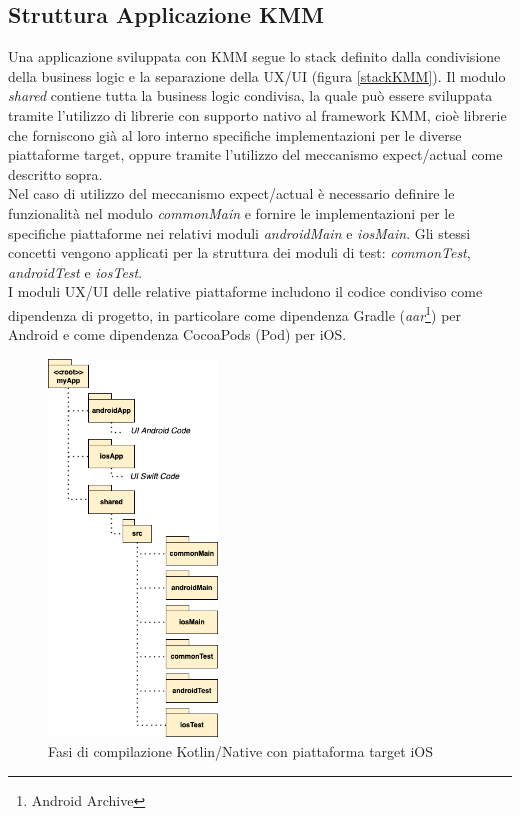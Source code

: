 \subsection{Struttura Applicazione KMM}
Una applicazione sviluppata con KMM segue lo stack definito dalla condivisione della business logic e la separazione della UX/UI (figura \ref{stackKMM}). Il modulo \textit{shared} contiene tutta la business logic condivisa, la quale può essere sviluppata tramite l'utilizzo di librerie con supporto nativo al framework KMM, cioè librerie che forniscono già al loro interno specifiche implementazioni per le diverse piattaforme target, oppure tramite l'utilizzo del meccanismo expect/actual come descritto sopra.\\
Nel caso di utilizzo del meccanismo expect/actual è necessario definire le funzionalità nel modulo \textit{commonMain} e fornire le implementazioni per le specifiche piattaforme nei relativi moduli \textit{androidMain} e \textit{iosMain}. Gli stessi concetti vengono applicati per la struttura dei moduli di test: \textit{commonTest}, \textit{androidTest} e \textit{iosTest}.\\
I moduli UX/UI delle relative piattaforme includono il codice condiviso come dipendenza di progetto, in particolare come dipendenza Gradle (\textit{aar}\footnote{Android Archive}) per Android e come dipendenza CocoaPods (Pod) per iOS.

\begin{figure}[H]
\centering
\includegraphics[width=0.4\textwidth]{img/tesi-2-Page-14.drawio.png}
\caption{Fasi di compilazione Kotlin/Native con piattaforma target iOS}
\end{figure}

